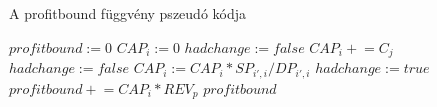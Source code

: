 \begin{algorithm}[H]
\caption{A profitbound függvény pszeudó kódja}
\label{profitbound}
\begin{algorithmic}[1]
	\State $profitbound:= 0$
	\State $CAP_{i}:= 0$
	\State $hadchange:= false$
			\State $CAP_{i} \mathrel{+}= C_{j}$			
		\EndFor
	\EndFor
		\State $hadchange:= false$
					\State $CAP_{i}:= CAP_{i}*SP_{i',i}/DP_{i',i}$
					\State $hadchange:= true$
				\EndIf
			\EndFor	
		\EndFor
	\EndWhile
				\State $profitbound \mathrel{+}= CAP_{i}*REV_{p}$
			\EndIf
		\EndFor
	\EndFor
	\State \Return $profitbound$
\EndProcedure
\end{algorithmic}
\end{algorithm}